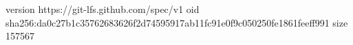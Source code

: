 version https://git-lfs.github.com/spec/v1
oid sha256:da0c27b1c35762683626f2d74595917ab11fc91e0f9c050250fe1861feeff991
size 157567
